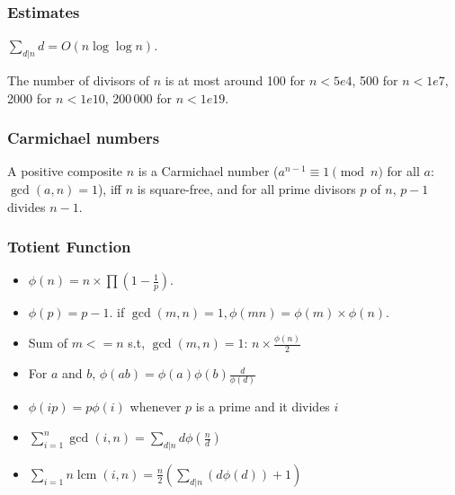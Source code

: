 \begin{small}
\subsubsection{Estimates}
  $\sum_{d|n} d = O(n \log \log n)$.

  The number of divisors of $n$ is at most around 100 for $n < 5e4$, 500 for $n < 1e7$, 2000 for $n < 1e10$, 200\,000 for $n < 1e19$.

\subsubsection{Carmichael numbers}
A positive composite $n$ is a Carmichael number
($a^{n-1} \equiv 1 \pmod{n}$ for all $a$: $\gcd(a,n)=1$),
iff $n$ is square-free, and for all prime divisors $p$ of $n$, $p-1$ divides $n-1$.

\subsubsection{Totient Function}
\begin{itemize}[noitemsep]
  \itemsep0em
  \item $\phi(n) = n \times \prod \left(1 - \frac{1}{p} \right)$.
  \item $\phi(p) = p - 1$. if $\operatorname{gcd}(m, n) = 1, \phi(mn) = \phi(m) \times \phi(n)$.
  \item Sum of $m <= n$ s.t, $\operatorname{gcd}(m, n) = 1$: $n \times \frac{\phi(n)}{2}$
  \item For \( a \) and \( b \), \( \phi(ab) = \phi(a)\phi(b)\frac{d}{\phi(d)} \)
  \item \( \phi (ip) = p \phi(i) \) whenever \( p \) is a prime and it divides \( i \)
  \item \( \sum_{i=1}^n \operatorname{gcd}(i, n) = \sum_{d|n} d \phi(\frac{n}{d}) \)
  \item \( \sum_{i=1}{n} \operatorname{lcm}(i, n) = \frac{n}{2}(\sum_{d|n}(d \phi(d))+1) \)
\end{itemize}


\end{small}
